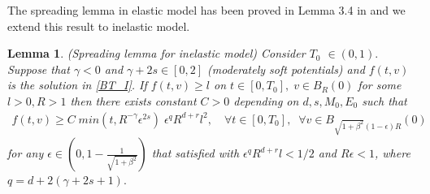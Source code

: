 \documentclass[reqno,10pt]{amsart}
\newtheorem{lemma}[theorem]{Lemma}
\numberwithin{equation}{section}
\begin{document}
The spreading lemma in elastic model has been proved in Lemma 3.4 in \cite{IM2020} and we extend this result to inelastic model.

\begin{lemma} (Spreading lemma for inelastic model) \label{spreading_I} Consider $T_0$ $\in (0,1).$ Suppose that $\gamma<0$ and $\gamma+2s \in [0,2]$ (moderately soft potentials) and $f(t,v)$ is the solution in \eqref{BT_I}. 
If $f(t,v) \geq l$ on $ t \in [0,T_0], \; v\in B_R(0)$ \;for some $l>0, R>1$ then there exists constant $C>0$ depending on $d, s, M_0, E_0$ such that
\begin{align*}
    f(t,v) \geq C\; min(t, R^{-\gamma}\epsilon^{2s})\; \epsilon^q R^{d+r}l^2, \quad \forall t \in [0,T_0], \;\;
    \forall v\in B_{\sqrt{1+\beta^2}(1-\epsilon)R}(0)
\end{align*}
for any $\epsilon \in (0, 1-\frac{1}{\sqrt{1+\beta^2}})$ that satisfied with $\epsilon^{q}R^{d+r}l < 1/2$ and $R\epsilon < 1$, where $q=d+2(\gamma+2s+1).$
\end{lemma}
\end{document}
